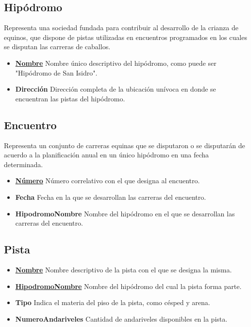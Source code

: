 \documentclass[a4paper,11pt]{article}
\begin{document}
\subsection{Hipódromo}

Representa una sociedad fundada para contribuir al desarrollo de la crianza de
equinos, que dispone de pistas utilizadas en encuentros programados en los
cuales se disputan las carreras de caballos.

\begin{itemize}

  \item \textbf{\uline{Nombre}} Nombre único descriptivo del hipódromo, como
    puede ser "Hipódromo de San Isidro".

  \item \textbf{Dirección} Dirección completa de la ubicación unívoca en donde
    se encuentran las pistas del hipódromo.

\end{itemize}

\subsection{Encuentro}

Representa un conjunto de carreras equinas que se disputaron o se disputarán de
acuerdo a la planificación anual en un único hipódromo en una fecha
determinada.

\begin{itemize}

  \item \textbf{\uline{Número}} Número correlativo con el que designa al
    encuentro.

  \item \textbf{Fecha} Fecha en la que se desarrollan las carreras del
    encuentro.

  \item \textbf{HipodromoNombre} Nombre del hipódromo en el que se
    desarrollan las carreras del encuentro.

\end{itemize}

\subsection{Pista}

\begin{itemize}

  \item \textbf{\uline{Nombre}} Nombre descriptivo de la pista con el que se
    designa la misma.

  \item \textbf{\uline{HipodromoNombre}} Nombre del hipódromo del
    cual la pista forma parte.

  \item \textbf{Tipo} Indica el materia del piso de la pista, como césped y
    arena.

  \item \textbf{NumeroAndariveles} Cantidad de andariveles disponibles en la
    pista.

\end{itemize}
\end{document}
